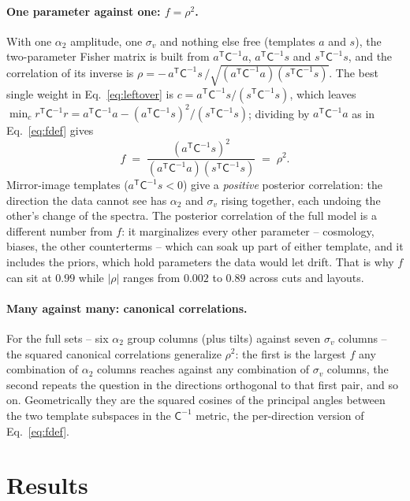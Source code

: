 \documentclass[11pt]{article}
\newcommand{\Cov}{\mathsf{C}}
\newcommand{\T}{^{\mathsf{T}}}
\newcommand{\sv}{\sigma_v}
\begin{document}
\paragraph{One parameter against one: $f = \rho^2$.}
With one $\alpha_2$ amplitude, one $\sv$ and nothing else free
(templates $a$ and $s$), the
two-parameter Fisher matrix is built from $a\T\Cov^{-1}a$,
$a\T\Cov^{-1}s$ and $s\T\Cov^{-1}s$, and the correlation of its
inverse is $\rho = -\,a\T\Cov^{-1}s\,/\sqrt{(a\T\Cov^{-1}a)
(s\T\Cov^{-1}s)}$.  The best single weight in
Eq.~\eqref{eq:leftover} is $c = a\T\Cov^{-1}s/(s\T\Cov^{-1}s)$, which
leaves $\min_c r\T\Cov^{-1}r = a\T\Cov^{-1}a -
(a\T\Cov^{-1}s)^2/(s\T\Cov^{-1}s)$; dividing by $a\T\Cov^{-1}a$ as in
Eq.~\eqref{eq:fdef} gives
\begin{equation*}
  f \;=\; \frac{(a\T\Cov^{-1}s)^2}{(a\T\Cov^{-1}a)(s\T\Cov^{-1}s)}
  \;=\; \rho^2 .
\end{equation*}
Mirror-image templates
($a\T\Cov^{-1}s < 0$) give a \emph{positive} posterior correlation:
the direction the data cannot see has $\alpha_2$ and $\sv$ rising
together, each undoing the other's change of the spectra.  The
posterior correlation of the full model is a different number from
$f$: it marginalizes every other parameter -- cosmology, biases, the
other counterterms -- which can soak up part of either template, and
it includes the priors, which hold parameters the data would let
drift.  That is why $f$ can sit at $0.99$ while $|\rho|$ ranges from
$0.002$ to $0.89$ across cuts and layouts.

\paragraph{Many against many: canonical correlations.}
For the full sets -- six $\alpha_2$ group columns (plus tilts) against
seven $\sv$ columns -- the squared canonical correlations generalize
$\rho^2$: the first is the largest $f$ any combination of $\alpha_2$
columns reaches against any combination of $\sv$ columns, the second
repeats the question in the directions orthogonal to that first pair,
and so on.  Geometrically they are the squared cosines of the
principal angles between the two template subspaces in the
$\Cov^{-1}$ metric, the per-direction version of Eq.~\eqref{eq:fdef}.

\section{Results}
\label{sec:results}
\end{document}
